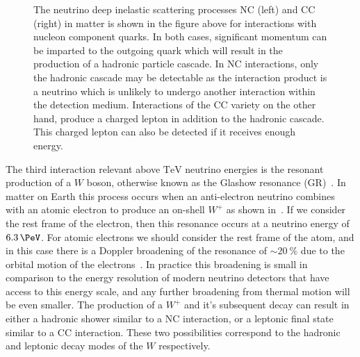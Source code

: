 \begin{figure}
	\centering
	\caption{The neutrino deep inelastic scattering processes NC (left) and CC (right) in matter is shown in the figure above for interactions with nucleon component quarks.
	In both cases, significant momentum can be imparted to the outgoing quark which will result in the production of a hadronic particle cascade.
	In NC interactions, only the hadronic cascade may be detectable as the interaction product is a neutrino which is unlikely to undergo another interaction within the detection medium.
	Interactions of the CC variety on the other hand, produce a charged lepton in addition to the hadronic cascade.
	This charged lepton can also be detected if it receives enough energy.}
	\label{fig:DIS}
\end{figure}

The third interaction relevant above $\si\TeV$ neutrino energies is the resonant production of a $W$ boson, otherwise known as the Glashow resonance (GR)~\cite{Glashow:1960zz}.
In matter on Earth this process occurs when an anti-electron neutrino combines with an atomic electron to produce an on-shell $W^+$ as shown in~.
If we consider the rest frame of the electron, then this resonance occurs at a neutrino energy of $\SI{6.3}\PeV$.
For atomic electrons we should consider the rest frame of the atom, and in this case there is a Doppler broadening of the resonance of $\sim\SI{20}\percent$ due to the orbital motion of the electrons~\cite{Loewy:2014zva}.
In practice this broadening is small in comparison to the energy resolution of modern neutrino detectors that have access to this energy scale, and any further broadening from thermal motion will be even smaller.
The production of a $W^+$ and it's subsequent decay can result in either a hadronic shower similar to a NC interaction, or a leptonic final state similar to a CC interaction.
These two possibilities correspond to the hadronic and leptonic decay modes of the $W$ respectively.

